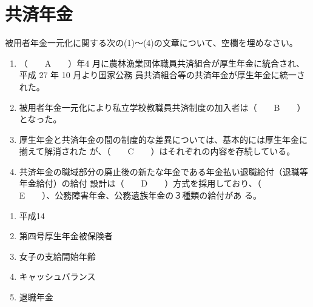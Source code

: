 \section{共済年金}

\begin{fillblank}[年金1 H29 問題1(2)]
  被用者年金一元化に関する次の(1)～(4)の文章について、空欄を埋めなさい。

\begin{enumerate}[(1)]
  \item  （　　A　　）年4 月に農林漁業団体職員共済組合が厚生年金に統合され、平成 27 年 10 月より国家公務
員共済組合等の共済年金が厚生年金に統一された。\\
  \item 被用者年金一元化により私立学校教職員共済制度の加入者は（　　B　　）となった。\\
  \item 厚生年金と共済年金の間の制度的な差異については、基本的には厚生年金に揃えて解消された
が、（　　C　　）はそれぞれの内容を存続している。\\
  \item 共済年金の職域部分の廃止後の新たな年金である年金払い退職給付（退職等年金給付）の給付
設計は（　　D　　）方式を採用しており、（　　E　　）、公務障害年金、公務遺族年金の３種類の給付があ
る。
\end{enumerate}
\end{fillblank}

\begin{answerbox}
  \begin{enumerate}[A: ]
    \item 平成14
    \item 第四号厚生年金被保険者
    \item 女子の支給開始年齢
    \item キャッシュバランス
    \item 退職年金
  \end{enumerate}
\end{answerbox}

\newpage